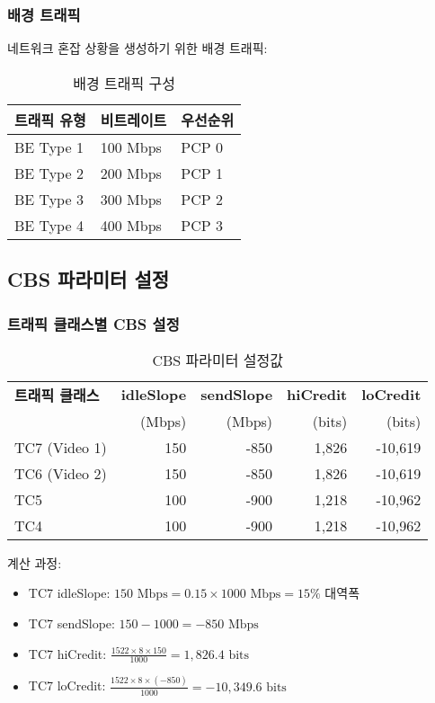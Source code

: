 \documentclass[twocolumn,10pt]{article}
\begin{document}
\subsubsection{배경 트래픽}

네트워크 혼잡 상황을 생성하기 위한 배경 트래픽:

\begin{table}[h]
\centering
\caption{배경 트래픽 구성}
\label{tab:background_traffic}
\begin{tabular}{lll}
\toprule
\textbf{트래픽 유형} & \textbf{비트레이트} & \textbf{우선순위} \\
\midrule
BE Type 1 & 100 Mbps & PCP 0 \\
BE Type 2 & 200 Mbps & PCP 1 \\
BE Type 3 & 300 Mbps & PCP 2 \\
BE Type 4 & 400 Mbps & PCP 3 \\
\bottomrule
\end{tabular}
\end{table}

\subsection{CBS 파라미터 설정}

\subsubsection{트래픽 클래스별 CBS 설정}

\begin{table}[h]
\centering
\caption{CBS 파라미터 설정값}
\label{tab:cbs_parameters}
\begin{tabular}{lrrrr}
\toprule
\textbf{트래픽 클래스} & \textbf{idleSlope} & \textbf{sendSlope} & \textbf{hiCredit} & \textbf{loCredit} \\
 & (Mbps) & (Mbps) & (bits) & (bits) \\
\midrule
TC7 (Video 1) & 150 & -850 & 1,826 & -10,619 \\
TC6 (Video 2) & 150 & -850 & 1,826 & -10,619 \\
TC5 & 100 & -900 & 1,218 & -10,962 \\
TC4 & 100 & -900 & 1,218 & -10,962 \\
\bottomrule
\end{tabular}
\end{table}

계산 과정:
\begin{itemize}
    \item TC7 idleSlope: $150 \text{ Mbps} = 0.15 \times 1000 \text{ Mbps} = 15\%$ 대역폭
    \item TC7 sendSlope: $150 - 1000 = -850 \text{ Mbps}$
    \item TC7 hiCredit: $\frac{1522 \times 8 \times 150}{1000} = 1,826.4 \text{ bits}$
    \item TC7 loCredit: $\frac{1522 \times 8 \times (-850)}{1000} = -10,349.6 \text{ bits}$
\end{itemize}
\end{document}
